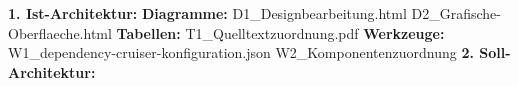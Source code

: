 \textbf{1. Ist-Architektur:}\newline
\indent \textbf{Diagramme:}\newline
\indent \indent D1\_Designbearbeitung.html\newline
\indent \indent D2\_Grafische-Oberflaeche.html\newline
\indent \textbf{Tabellen:}\newline
\indent \indent T1\_Quelltextzuordnung.pdf\newline
\indent \textbf{Werkzeuge:}\newline
\indent \indent W1\_dependency-cruiser-konfiguration.json\newline
\indent \indent W2\_Komponentenzuordnung\newline
\textbf{2. Soll-Architektur:}